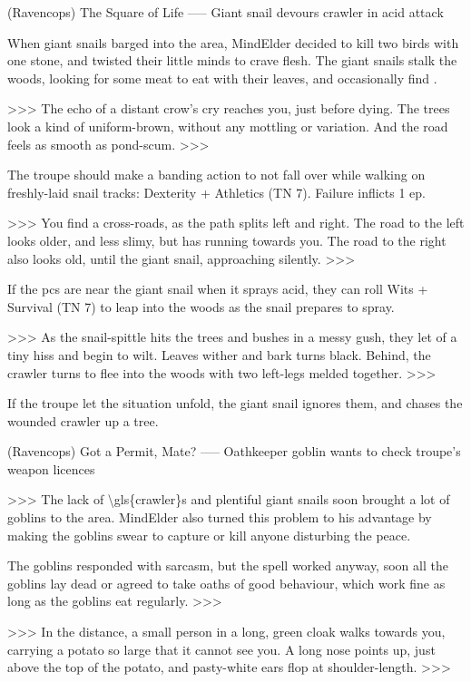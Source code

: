 (Ravencops) The Square of Life
-----
{Giant snail devours \gls{crawler} in acid attack}

When giant snails barged into the area, MindElder decided to kill two birds with one stone, and twisted their little minds to crave flesh.
The giant snails stalk the woods, looking for some meat to eat with their leaves, and occasionally find .

>>>
The echo of a distant crow's cry reaches you, just before dying.
The trees look a kind of uniform-brown, without any mottling or variation.
And the road feels as smooth as pond-scum.
>>>

The troupe should make a banding action to not fall over while walking on freshly-laid snail tracks: Dexterity + Athletics (TN 7).
Failure inflicts 1 \gls{ep}.

>>>
You find a cross-roads, as the path splits left and right.
The road to the left looks older, and less slimy, but has  running towards you.
The road to the right also looks old, until the giant snail, approaching silently.
>>>

If the \glspl{pc}  are near the giant snail when it sprays acid, they can roll Wits + Survival (TN 7) to leap into the woods as the snail prepares to spray.

>>>
As the snail-spittle hits the trees and bushes in a messy gush, they let of a tiny hiss and begin to wilt.
Leaves wither and bark turns black.
Behind, the \gls{crawler} turns to flee into the woods with two left-legs melded together.
>>>

If the troupe let the situation unfold, the giant snail ignores them, and chases the wounded \gls{crawler} up a tree.

(Ravencops) Got a Permit, Mate?
-----
{Oathkeeper goblin wants to check troupe's weapon licences}

>>>
The lack of \glspl{\gls{crawler}} and plentiful giant snails soon brought a lot of goblins to the area.
MindElder also turned this problem to his advantage by making the goblins swear to capture or kill anyone disturbing the peace.

The goblins responded with sarcasm, but the spell worked anyway, soon all the goblins lay dead or agreed to take oaths of good behaviour, which work fine as long as the goblins eat regularly.
>>>

>>>
In the distance, a small person in a long, green cloak walks towards you, carrying a potato so large that it cannot see you.
A long nose points up, just above the top of the potato, and pasty-white ears flop at shoulder-length.
>>>

